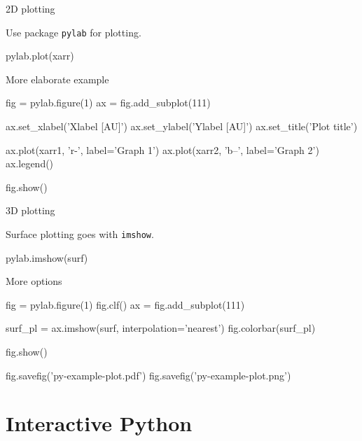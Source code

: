 \documentclass[xetex,10pt]{beamer}
\def\pythoni{\lstinline[language=pythontim]}
\def\spacer{\vspace*{1em}}
\begin{document}
\begin{frame}[fragile]{2D plotting}

Use package \pythoni{pylab} for plotting.

\begin{python}
pylab.plot(xarr)
\end{python}

\spacer
\pause
More elaborate example

\begin{python}
fig = pylab.figure(1)
ax = fig.add_subplot(111)

ax.set_xlabel('Xlabel [AU]')
ax.set_ylabel('Ylabel [AU]')
ax.set_title('Plot title')

ax.plot(xarr1, 'r-', label='Graph 1')
ax.plot(xarr2, 'b--', label='Graph 2')
ax.legend()

fig.show()
\end{python}

\end{frame}

\begin{frame}[fragile]{3D plotting}

Surface plotting goes with \pythoni{imshow}.

\begin{python}
pylab.imshow(surf)
\end{python}

\spacer
\pause
More options

\begin{python}
fig = pylab.figure(1)
fig.clf()
ax = fig.add_subplot(111)

surf_pl = ax.imshow(surf, interpolation='nearest')
fig.colorbar(surf_pl)

fig.show()

fig.savefig('py-example-plot.pdf')
fig.savefig('py-example-plot.png')
\end{python}

\end{frame}

\section{Interactive Python}
\end{document}
